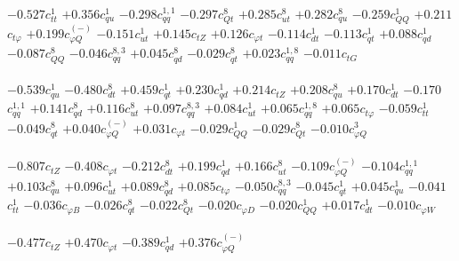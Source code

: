 \documentclass{article}
\begin{document}
{$-0.527$}{\rm $c_{tt}^{1}$} 
{$+0.356$}{\rm $c_{qu}^{1}$} 
{$-0.298$}{\rm $c_{qq}^{1,1}$} 
{$-0.297$}{\rm $c_{Qt}^{8}$} 
{$+0.285$}{\rm $c_{ut}^{8}$} 
{$+0.282$}{\rm $c_{qu}^{8}$} 
{$-0.259$}{\rm $c_{QQ}^{1}$} 
{$+0.211$}{\rm $c_{t \varphi}$} 
{$+0.199$}{\rm $c_{\varphi Q}^{(-)}$} 
{$-0.151$}{\rm $c_{ut}^{1}$} 
{$+0.145$}{\rm $c_{tZ}$} 
{$+0.126$}{\rm $c_{\varphi t}$} 
{$-0.114$}{\rm $c_{dt}^{1}$} 
{$-0.113$}{\rm $c_{qt}^{1}$} 
{$+0.088$}{\rm $c_{qd}^{1}$} 
{$-0.087$}{\rm $c_{QQ}^{8}$} 
{$-0.046$}{\rm $c_{qq}^{8,3}$} 
{$+0.045$}{\rm $c_{qd}^{8}$} 
{$-0.029$}{\rm $c_{qt}^{8}$} 
{$+0.023$}{\rm $c_{qq}^{1,8}$} 
{$-0.011$}{\rm $c_{tG}$} 
 \nonumber \\ \nonumber \\ 
{$-0.539$}{\rm $c_{qu}^{1}$} 
{$-0.480$}{\rm $c_{dt}^{8}$} 
{$+0.459$}{\rm $c_{qt}^{1}$} 
{$+0.230$}{\rm $c_{qd}^{1}$} 
{$+0.214$}{\rm $c_{tZ}$} 
{$+0.208$}{\rm $c_{qu}^{8}$} 
{$+0.170$}{\rm $c_{dt}^{1}$} 
{$-0.170$}{\rm $c_{qq}^{1,1}$} 
{$+0.141$}{\rm $c_{qd}^{8}$} 
{$+0.116$}{\rm $c_{ut}^{8}$} 
{$+0.097$}{\rm $c_{qq}^{8,3}$} 
{$+0.084$}{\rm $c_{ut}^{1}$} 
{$+0.065$}{\rm $c_{qq}^{1,8}$} 
{$+0.065$}{\rm $c_{t \varphi}$} 
{$-0.059$}{\rm $c_{tt}^{1}$} 
{$-0.049$}{\rm $c_{qt}^{8}$} 
{$+0.040$}{\rm $c_{\varphi Q}^{(-)}$} 
{$+0.031$}{\rm $c_{\varphi t}$} 
{$-0.029$}{\rm $c_{QQ}^{1}$} 
{$-0.029$}{\rm $c_{Qt}^{8}$} 
{$-0.010$}{\rm $c_{\varphi Q}^{3}$} 
 \nonumber \\ \nonumber \\ 
{$-0.807$}{\rm $c_{tZ}$} 
{$-0.408$}{\rm $c_{\varphi t}$} 
{$-0.212$}{\rm $c_{dt}^{8}$} 
{$+0.199$}{\rm $c_{qd}^{1}$} 
{$+0.166$}{\rm $c_{ut}^{8}$} 
{$-0.109$}{\rm $c_{\varphi Q}^{(-)}$} 
{$-0.104$}{\rm $c_{qq}^{1,1}$} 
{$+0.103$}{\rm $c_{qu}^{8}$} 
{$+0.096$}{\rm $c_{ut}^{1}$} 
{$+0.089$}{\rm $c_{qd}^{8}$} 
{$+0.085$}{\rm $c_{t \varphi}$} 
{$-0.050$}{\rm $c_{qq}^{8,3}$} 
{$-0.045$}{\rm $c_{qt}^{1}$} 
{$+0.045$}{\rm $c_{qu}^{1}$} 
{$-0.041$}{\rm $c_{tt}^{1}$} 
{$-0.036$}{\rm $c_{\varphi B}$} 
{$-0.026$}{\rm $c_{qt}^{8}$} 
{$-0.022$}{\rm $c_{Qt}^{8}$} 
{$-0.020$}{\rm $c_{\varphi D}$} 
{$-0.020$}{\rm $c_{QQ}^{1}$} 
{$+0.017$}{\rm $c_{dt}^{1}$} 
{$-0.010$}{\rm $c_{\varphi W}$} 
 \nonumber \\ \nonumber \\ 
{$-0.477$}{\rm $c_{tZ}$} 
{$+0.470$}{\rm $c_{\varphi t}$} 
{$-0.389$}{\rm $c_{qd}^{1}$} 
{$+0.376$}{\rm $c_{\varphi Q}^{(-)}$} 
\end{document}
